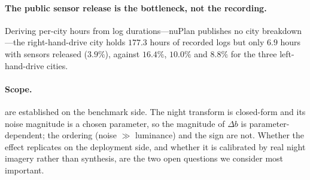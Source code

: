 \paragraph{The public sensor release is the bottleneck, not the recording.} Deriving per-city
hours from log durations---nuPlan publishes no city breakdown---the right-hand-drive city
holds $177.3$ hours of recorded logs but only $6.9$ hours with sensors released ($3.9\%$),
against $16.4\%$, $10.0\%$ and $8.8\%$ for the three left-hand-drive cities.

\paragraph{Scope.}  are established on the
benchmark side. The night transform is closed-form and its noise magnitude is a chosen
parameter, so the magnitude of $\Delta b$ is parameter-dependent; the ordering (noise
$\gg$ luminance) and the sign are not. Whether the effect replicates on the deployment side, and
whether it is calibrated by real night imagery rather than synthesis, are the two open questions
we consider most important.
